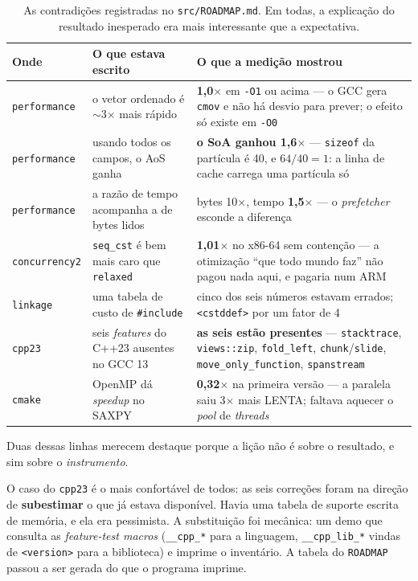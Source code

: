 \begin{table}[htbp]
\centering
\caption{As contradições registradas no \texttt{src/ROADMAP.md}. Em todas, a
         explicação do resultado inesperado era mais interessante que a
         expectativa.}
\label{tab:contradicoes}
\footnotesize
\begin{tabular}{@{}p{}p{}p{}@{}}
\toprule
\textbf{Onde} & \textbf{O que estava escrito} & \textbf{O que a medição mostrou} \\
\midrule
\texttt{performance} & o vetor ordenado é $\sim$3$\times$ mais rápido &
    \textbf{1{,}0$\times$} em \texttt{-O1} ou acima --- o GCC gera \texttt{cmov} e
    não há desvio para prever; o efeito só existe em \texttt{-O0} \\[3pt]
\texttt{performance} & usando todos os campos, o AoS ganha &
    \textbf{o SoA ganhou 1{,}6$\times$} --- \texttt{sizeof} da partícula é 40, e
    $64/40 = 1$: a linha de cache carrega uma partícula só \\[3pt]
\texttt{performance} & a razão de tempo acompanha a de bytes lidos &
    bytes 10$\times$, tempo \textbf{1{,}5$\times$} --- o \emph{prefetcher} esconde
    a diferença \\[3pt]
\texttt{concurrency2} & \texttt{seq\_cst} é bem mais caro que \texttt{relaxed} &
    \textbf{1{,}01$\times$} no x86-64 sem contenção --- a otimização ``que todo
    mundo faz'' não pagou nada aqui, e pagaria num ARM \\[3pt]
\texttt{linkage} & uma tabela de custo de \texttt{\#include} &
    cinco dos seis números estavam errados; \texttt{<cstddef>} por um fator de 4 \\[3pt]
\texttt{cpp23} & seis \emph{features} do C++23 ausentes no GCC 13 &
    \textbf{as seis estão presentes} --- \texttt{stacktrace}, \texttt{views::zip},
    \texttt{fold\_left}, \texttt{chunk}/\texttt{slide},
    \texttt{move\_only\_function}, \texttt{spanstream} \\[3pt]
\texttt{cmake} & OpenMP dá \emph{speedup} no SAXPY &
    \textbf{0{,}32$\times$} na primeira versão --- a paralela saiu 3$\times$ mais
    LENTA; faltava aquecer o \emph{pool} de \emph{threads} \\
\bottomrule
\end{tabular}
\end{table}

Duas dessas linhas merecem destaque porque a lição não é sobre o resultado, e
sim sobre o \emph{instrumento}.

O caso do \texttt{cpp23} é o mais confortável de todos: as seis correções foram
na direção de \textbf{subestimar} o que já estava disponível. Havia uma tabela
de suporte escrita de memória, e ela era pessimista. A substituição foi
mecânica: um demo que consulta as \emph{feature-test macros}
(\texttt{\_\_cpp\_*} para a linguagem, \texttt{\_\_cpp\_lib\_*} vindas de
\texttt{<version>} para a biblioteca) e imprime o inventário. A tabela do
\texttt{ROADMAP} passou a ser gerada do que o programa imprime.

